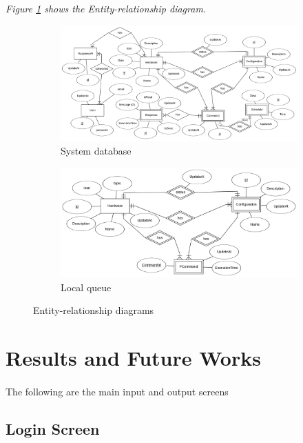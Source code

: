 \documentclass[12pt]{paper}
\begin{document}
	\textit{Figure \ref{fig:erd} shows the Entity-relationship diagram.} 
	\begin{figure}[H]
		\begin{subfigure}[b]{\linewidth}
			\includegraphics[width=\linewidth]{img/diagram_er1.png}
			\caption{System database}
		\end{subfigure}
		
		\begin{subfigure}[b]{\linewidth}
			\includegraphics[width=\linewidth]{img/diagram_er2.png}
			\caption{Local queue}
		\end{subfigure}
		\caption{Entity-relationship diagrams}
		\label{fig:erd}
	\end{figure}
	
	


		\newpage\section{Results and Future Works}
		\paragraph{} The following are the main input and output screens
		\subsection{Login Screen}
\end{document}
